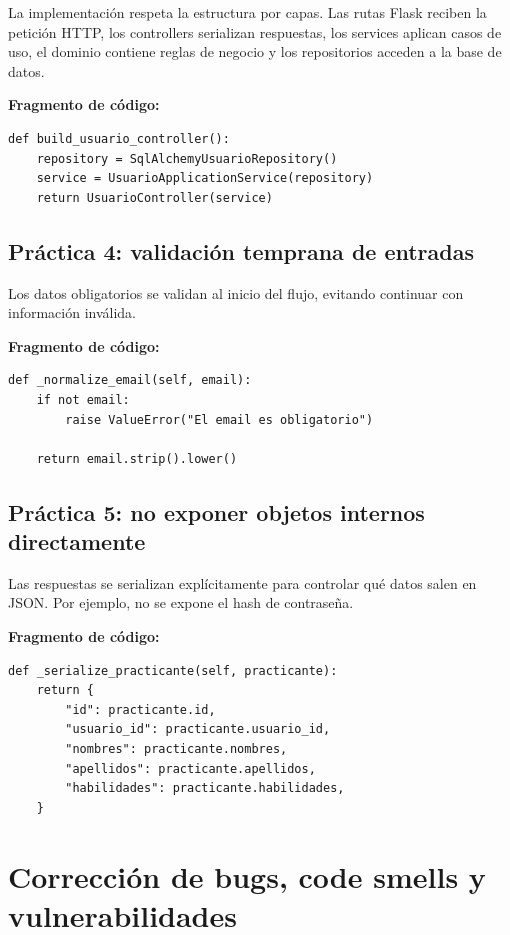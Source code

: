 \documentclass[12pt,a4paper]{article}
\begin{document}
La implementación respeta la estructura por capas. Las rutas Flask reciben la petición HTTP, los controllers serializan respuestas, los services aplican casos de uso, el dominio contiene reglas de negocio y los repositorios acceden a la base de datos.

\textbf{Fragmento de código:}

\begin{lstlisting}[style=pythonstyle]
def build_usuario_controller():
    repository = SqlAlchemyUsuarioRepository()
    service = UsuarioApplicationService(repository)
    return UsuarioController(service)
\end{lstlisting}

\subsection{Práctica 4: validación temprana de entradas}

Los datos obligatorios se validan al inicio del flujo, evitando continuar con información inválida.

\textbf{Fragmento de código:}

\begin{lstlisting}[style=pythonstyle]
def _normalize_email(self, email):
    if not email:
        raise ValueError("El email es obligatorio")

    return email.strip().lower()
\end{lstlisting}

\subsection{Práctica 5: no exponer objetos internos directamente}

Las respuestas se serializan explícitamente para controlar qué datos salen en JSON. Por ejemplo, no se expone el hash de contraseña.

\textbf{Fragmento de código:}

\begin{lstlisting}[style=pythonstyle]
def _serialize_practicante(self, practicante):
    return {
        "id": practicante.id,
        "usuario_id": practicante.usuario_id,
        "nombres": practicante.nombres,
        "apellidos": practicante.apellidos,
        "habilidades": practicante.habilidades,
    }
\end{lstlisting}

\section{Corrección de bugs, code smells y vulnerabilidades}
\end{document}
